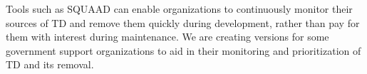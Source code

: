 Tools such as SQUAAD can enable organizations to continuously monitor their sources of TD and remove them quickly during development, rather than pay for them with interest during maintenance. We are creating versions for some government support organizations to aid in their monitoring and prioritization of TD and its removal. 

%
